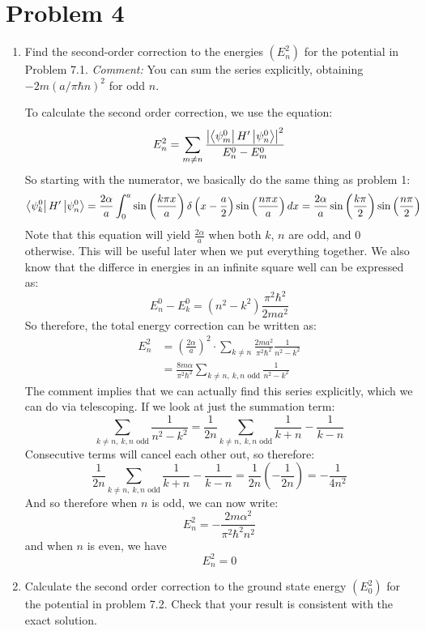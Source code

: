 \documentclass[10pt]{article}
\begin{document}
    \section*{Problem 4} 
    \begin{enumerate}[label=(\alph*)]
        \item Find the second-order correction to the energies $(E_n^2)$ for the potential in Problem 7.1. \textit{Comment:} You can sum the series explicitly, obtaining $-2m(a/\pi \hbar n)^2$ for odd $n$.
        
        \begin{solution}
            To calculate the second order correction, we use the equation: 
            \[E_n^2 = \sum_{m\neq n}\frac{\left|\bra{\psi_m^0}H'\ket{\psi_n^0}\right|^2}{E_n^0 - E_m^0}\]
            So starting with the numerator, we basically do the same thing as problem 1: 
            \begin{align*}
                \bra{\psi_k^0}H'\ket{\psi_n^0} &= \frac{2\alpha}{a}\int_{0}^{a}\sin\left(\frac{k\pi x}{a}\right)\delta\left(x - \frac{a}{2}\right)\sin\left(\frac{n\pi x}{a}\right)dx = \frac{2\alpha}{a}\sin\left(\frac{k\pi}{2}\right)\sin\left(\frac{n\pi}{2}\right)
            \end{align*}
            Note that this equation will yield $\frac{2\alpha}{a}$ when both $k$, $n$ are odd, and 0 otherwise. This will be useful later when we put everything together. We also know that the differce in energies in an infinite square well can be expressed as:
            \[ E_n^0 - E_k^0 = (n^2 -k^2) \frac{\pi^2\hbar^2}{2ma^2}\]
            So therefore, the total energy correction can be written as: 
            \begin{align*}
                E_n^2 &= \left(\frac{2\alpha}{a}\right)^2 \cdot \sum_{k \neq n} \frac{2ma^2}{\pi^2 \hbar^2}\frac{1}{n^2 - k^2}\\
                &= \frac{8m\alpha}{\pi^2 \hbar^2} \sum_{k \neq n, \ k, n \text{ odd}} \frac{1}{n^2 - k^2}
            \end{align*}
            The comment implies that we can actually find this series explicitly, which we can do via telescoping. If we look at just the summation term: 
            \[ \sum_{k \neq n, \ k, n \text{ odd}} \frac{1}{n^2 - k^2} = \frac{1}{2n} \sum_{k \neq n, \ k, n \text{ odd}} \frac{1}{k+n} - \frac{1}{k-n}\] 
            Consecutive terms will cancel each other out, so therefore: 
            \[ \frac{1}{2n} \sum_{k \neq n, \ k, n \text{ odd}}\frac{1}{k+n} - \frac{1}{k-n} = \frac{1}{2n} \left( - \frac{1}{2n}\right) = -\frac{1}{4n^2}\] And so therefore when $n$ is odd, we can now write: 
            \[ E_n^2 = -\frac{2m\alpha^2}{\pi^2 \hbar^2n^2}\]
            and when $n$ is even, we have 
            \[ E_n^2 = 0\]
        \end{solution}
        \item Calculate the second order correction to the ground state energy $(E_0^2)$ for the potential in problem 7.2. Check that your result is consistent with the exact solution.
        

\end{enumerate}
\end{document}
